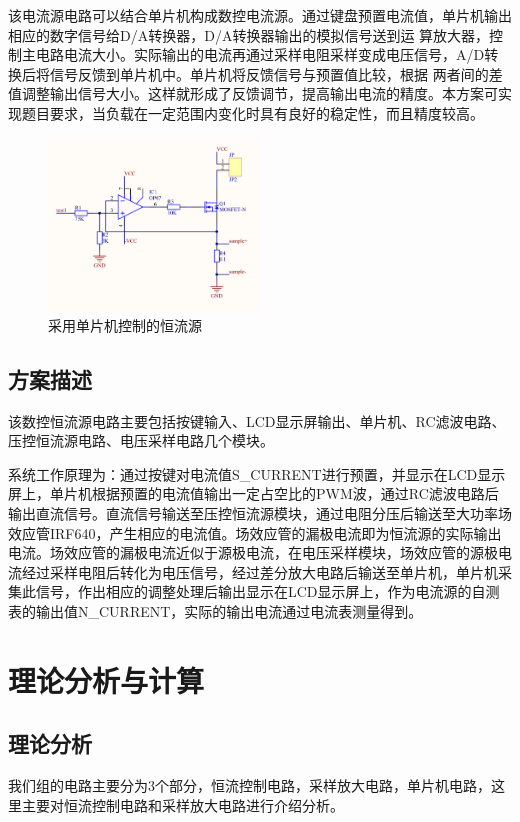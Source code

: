 \documentclass{zjureport}
\begin{document}
    
            该电流源电路可以结合单片机构成数控电流源。通过键盘预置电流值，单片机输出相应的数字信号给D/A转换器，D/A转换器输出的模拟信号送到运 算放大器，控制主电路电流大小。实际输出的电流再通过采样电阻采样变成电压信号，A/D转换后将信号反馈到单片机中。单片机将反馈信号与预置值比较，根据 两者间的差值调整输出信号大小。这样就形成了反馈调节，提高输出电流的精度。本方案可实现题目要求，当负载在一定范围内变化时具有良好的稳定性，而且精度较高。
            \begin{figure}[thp]
                \centering
                \includegraphics[width = 0.5\textwidth]{figure/采用单片机控制的恒流源.png}
                \caption{采用单片机控制的恒流源}
            \end{figure}

        \subsection{方案描述}

        该数控恒流源电路主要包括按键输入、LCD显示屏输出、单片机、RC滤波电路、压控恒流源电路、电压采样电路几个模块。

        系统工作原理为：通过按键对电流值S_CURRENT进行预置，并显示在LCD显示屏上，单片机根据预置的电流值输出一定占空比的PWM波，通过RC滤波电路后输出直流信号。直流信号输送至压控恒流源模块，通过电阻分压后输送至大功率场效应管IRF640，产生相应的电流值。场效应管的漏极电流即为恒流源的实际输出电流。场效应管的漏极电流近似于源极电流，在电压采样模块，场效应管的源极电流经过采样电阻后转化为电压信号，经过差分放大电路后输送至单片机，单片机采集此信号，作出相应的调整处理后输出显示在LCD显示屏上，作为电流源的自测表的输出值N_CURRENT，实际的输出电流通过电流表测量得到。

    \section{理论分析与计算}
        \subsection{理论分析}
        我们组的电路主要分为3个部分，恒流控制电路，采样放大电路，单片机电路，这里主要对恒流控制电路和采样放大电路进行介绍分析。
\end{document}
